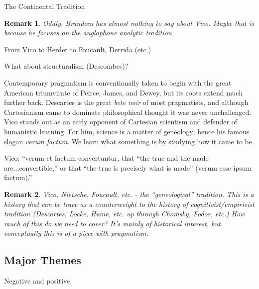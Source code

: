 \documentclass[11pt,twoside]{article}
\newtheorem{remark}{Remark}
\begin{document}
The Continental Tradition

\begin{remark}
    Oddly, Brandom has almost nothing to say about Vico.  Maybe that is because he focuses on the anglophone analytic tradition.
\end{remark}

From Vico to Herder to Foucault, Derrida (etc.)

What about structuralism (Descombes)?

Contemporary pragmatism is conventionally taken to begin with the
great American triumvirate of Peirce, James, and Dewey, but its roots
extend much further back.  Descartes is the great \textit{bete noir}
of most pragmatists, and although Cartesianism came to dominate
philosophical thought it was never unchallenged.  Vico stands out as
an early opponent of Cartesian scientism and defender of humanistic
learning.  For him, science is a matter of geneology; hence his famous
slogan \textit{verum factum}.  We learn what something is by studying
how it came to be.

Vico: ``verum et factum convertuntur, that “the true and the made
are...convertible,” or that “the true is precisely what is made”
(verum esse ipsum factum).'' \parencite{costelloe_giambattista_2012}

\begin{remark}
  Vico, Nietsche, Foucault, etc. - the ``geneological'' tradition.
  This is a history that can be trace as a counterweight to the
  history of cognitivist/empiricist tradition (Descartes, Locke, Hume,
  etc. up through Chomsky, Fodor, etc.)  How much of this do we need
  to cover?  It's mainly of historical interest, but conceptually this
  is of a piece with pragmatism.
\end{remark}

\cite{lollini_becoming_2012}

\cite{egginton_pragmatic_2004}

\subsection{Major Themes}

Negative and positive.
\end{document}
